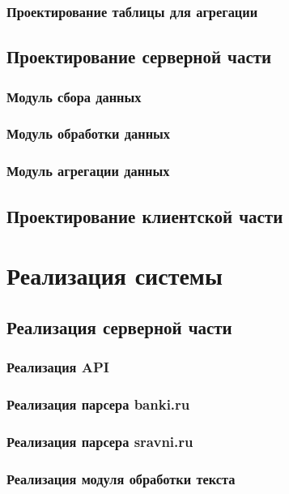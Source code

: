 \documentclass[PI, VKR]{HSEUniversity}
\begin{document}
\subsection{Проектирование таблицы для агрегации}
\label{sec:orga5a032a}
\section{Проектирование серверной части}
\label{sec:orgde3b59a}
\subsection{Модуль сбора данных}
\label{sec:orgfd684cd}
\subsection{Модуль обработки данных}
\label{sec:org3c11058}
\subsection{Модуль агрегации данных}
\label{sec:org6da4e9b}
\section{Проектирование клиентской части}
\label{sec:orgd058274}
\chapter{Реализация системы}
\label{sec:orgda63482}
\section{Реализация серверной части}
\label{sec:orgd85ff09}
\subsection{Реализация API}
\label{sec:orgd12486b}
\subsection{Реализация парсера banki.ru}
\label{sec:orgfe5db4e}
\subsection{Реализация парсера sravni.ru}
\label{sec:org86b2321}
\subsection{Реализация модуля обработки текста}
\label{sec:orgd888196}
\end{document}

